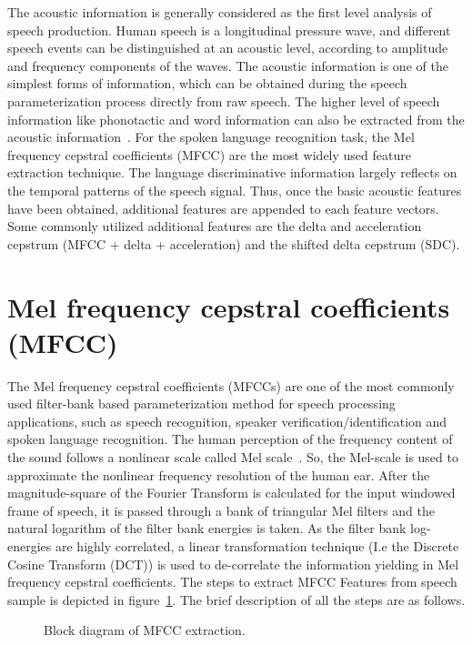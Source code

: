 \begin{spacing}{1.5}
The acoustic information is generally considered as the first level analysis of speech production. Human speech is a longitudinal pressure wave, and different speech events can be distinguished at an acoustic level, according to amplitude and frequency components of the waves. The acoustic information is one of the simplest forms of information, which can be obtained during the speech parameterization process directly from raw speech. The higher level of speech information like phonotactic and word information can also be extracted from the acoustic information~\cite{ambikairajah2011language}. For the spoken language recognition task, the Mel frequency cepstral coefficients (MFCC) are the most widely used feature extraction technique. The language discriminative information largely reflects on the temporal patterns of the speech signal. Thus, once the basic acoustic features have been obtained, additional features are appended to each feature vectors. Some commonly utilized additional features are the delta and acceleration cepstrum (MFCC + delta + acceleration) and the shifted delta cepstrum (SDC).

\section{Mel frequency cepstral coefficients (MFCC)}
The Mel frequency cepstral coefficients (MFCCs) are one of the most commonly used filter-bank based parameterization method for speech processing applications, such as speech recognition, speaker verification/identification and spoken language recognition. The human perception of the frequency content of the sound follows a nonlinear scale called Mel scale~\cite{chakroborty2009improved}. So, the Mel-scale is used to approximate the nonlinear frequency resolution of the human ear. After the magnitude-square of the Fourier Transform is calculated for the input windowed frame of speech, it is passed through a bank of triangular Mel filters and the natural logarithm of the filter bank energies is taken. As the filter bank log-energies are highly correlated, a linear transformation technique (I.e the Discrete Cosine Transform (DCT)) is used to de-correlate the information yielding in Mel frequency cepstral coefficients. The steps to extract MFCC Features from speech sample is depicted in figure~\ref{mfcc}. The brief description of all the steps are as follows.
\begin{figure}[h]
\caption{Block diagram of MFCC extraction.}
\label{mfcc}
\end{figure} 

\end{spacing}
